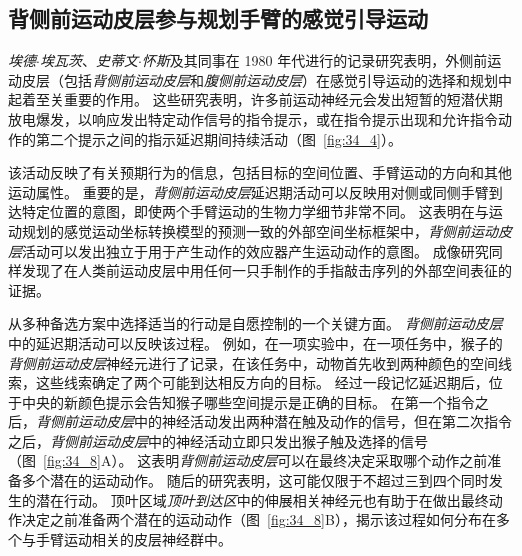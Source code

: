 \subsection{背侧前运动皮层参与规划手臂的感觉引导运动}

\textit{埃德$\cdot$埃瓦茨}、\textit{史蒂文$\cdot$怀斯}及其同事在 1980 年代进行的记录研究表明，外侧前运动皮层（包括\textit{背侧前运动皮层}和\textit{腹侧前运动皮层}）在感觉引导运动的选择和规划中起着至关重要的作用。
这些研究表明，许多前运动神经元会发出短暂的短潜伏期放电爆发，以响应发出特定动作信号的指令提示，或在指令提示出现和允许指令动作的第二个提示之间的指示延迟期间持续活动（图~\ref{fig:34_4}）。


该活动反映了有关预期行为的信息，包括目标的空间位置、手臂运动的方向和其他运动属性。
重要的是，\textit{背侧前运动皮层}延迟期活动可以反映用对侧或同侧手臂到达特定位置的意图，即使两个手臂运动的生物力学细节非常不同。
这表明在与运动规划的感觉运动坐标转换模型的预测一致的外部空间坐标框架中，\textit{背侧前运动皮层}活动可以发出独立于用于产生动作的效应器产生运动动作的意图。
成像研究同样发现了在人类前运动皮层中用任何一只手制作的手指敲击序列的外部空间表征的证据。


从多种备选方案中选择适当的行动是自愿控制的一个关键方面。
\textit{背侧前运动皮层}中的延迟期活动可以反映该过程。
例如，在一项实验中，在一项任务中，猴子的\textit{背侧前运动皮层}神经元进行了记录，在该任务中，动物首先收到两种颜色的空间线索，这些线索确定了两个可能到达相反方向的目标。 
经过一段记忆延迟期后，位于中央的新颜色提示会告知猴子哪些空间提示是正确的目标。
在第一个指令之后，\textit{背侧前运动皮层}中的神经活动发出两种潜在触及动作的信号，但在第二次指令之后，\textit{背侧前运动皮层}中的神经活动立即只发出猴子触及选择的信号（图~\ref{fig:34_8}A）。
这表明\textit{背侧前运动皮层}可以在最终决定采取哪个动作之前准备多个潜在的运动动作。
随后的研究表明，这可能仅限于不超过三到四个同时发生的潜在行动。
顶叶区域\textit{顶叶到达区}中的伸展相关神经元也有助于在做出最终动作决定之前准备两个潜在的运动动作（图~\ref{fig:34_8}B），揭示该过程如何分布在多个与手臂运动相关的皮层神经群中。


